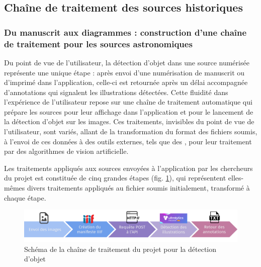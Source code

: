 
\subsection{Chaîne de traitement des sources historiques}
    \subsubsection{Du manuscrit aux diagrammes : construction d'une chaîne de traitement pour les sources astronomiques}
	Du point de vue de l'utilisateur, la détection d'objet dans une source numérisée représente une unique étape : après envoi d'une numérisation de manuscrit ou d'imprimé dans l'application, celle-ci est retournée après un délai accompagnée d'annotations qui signalent les illustrations détectées. Cette fluidité dans l'expérience de l'utilisateur repose sur une chaîne de traitement automatique qui prépare les sources pour leur affichage dans l'application et pour le lancement de la détection d'objet sur les images. Ces traitements, invisibles du point de vue de l'utilisateur, sont variés, allant de la transformation du format des fichiers soumis, à l'envoi de ces données à des outils externes, tels que des \api, pour leur traitement par des algorithmes de vision artificielle.
	
	Les traitements appliqués aux sources envoyées à l'application par les chercheurs du projet \eida est constituée de cinq grandes étapes (fig. \ref{fig:detection_workflow}), qui représentent elles-mêmes divers traitements appliqués au fichier soumis initialement, transformé à chaque étape. 
	
	\begin{figure}[h]
		\centering
		\includegraphics[width=16cm]{images/detection_workflow.png}
		\caption{Schéma de la chaîne de traitement du projet \eida pour la détection d'objet}
		\label{fig:detection_workflow}
	\end{figure}

